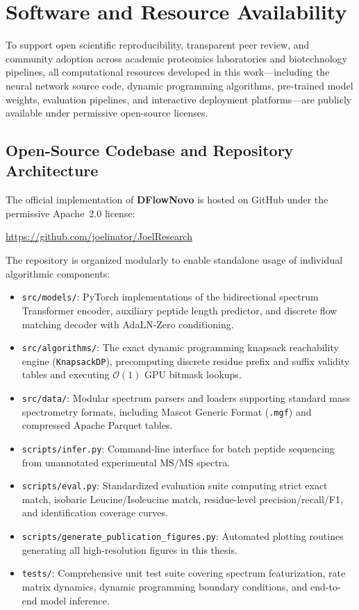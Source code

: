 \chapter{Software and Resource Availability}\label{app:software}

To support open scientific reproducibility, transparent peer review, and community adoption across academic proteomics laboratories and biotechnology pipelines, all computational resources developed in this work---including the neural network source code, dynamic programming algorithms, pre-trained model weights, evaluation pipelines, and interactive deployment platforms---are publicly available under permissive open-source licenses.

\section{Open-Source Codebase and Repository Architecture}

The official implementation of \textbf{DFlowNovo} is hosted on GitHub under the permissive Apache~2.0 license:
\begin{center}
\url{https://github.com/joelinator/JoelResearch}
\end{center}

The repository is organized modularly to enable standalone usage of individual algorithmic components:
\begin{itemize}
    \item \texttt{src/models/}: PyTorch implementations of the bidirectional spectrum Transformer encoder, auxiliary peptide length predictor, and discrete flow matching decoder with AdaLN-Zero conditioning.
    \item \texttt{src/algorithms/}: The exact dynamic programming knapsack reachability engine (\texttt{KnapsackDP}), precomputing discrete residue prefix and suffix validity tables and executing $\mathcal{O}(1)$ GPU bitmask lookups.
    \item \texttt{src/data/}: Modular spectrum parsers and loaders supporting standard mass spectrometry formats, including Mascot Generic Format (\texttt{.mgf}) and compressed Apache Parquet tables.
    \item \texttt{scripts/infer.py}: Command-line interface for batch peptide sequencing from unannotated experimental MS/MS spectra.
    \item \texttt{scripts/eval.py}: Standardized evaluation suite computing strict exact match, isobaric Leucine/Isoleucine match, residue-level precision/recall/F1, and identification coverage curves.
    \item \texttt{scripts/generate\_publication\_figures.py}: Automated plotting routines generating all high-resolution figures in this thesis.
    \item \texttt{tests/}: Comprehensive unit test suite covering spectrum featurization, rate matrix dynamics, dynamic programming boundary conditions, and end-to-end model inference.
\end{itemize}

